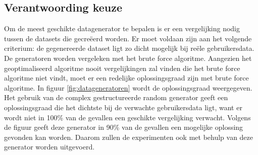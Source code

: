 \documentclass[Main.tex]{subfiles}
\begin{document}
\subsection{Verantwoording keuze}
Om de meest geschikte datagenerator te bepalen is er een vergelijking nodig tussen de datasets die gecre\"eerd worden. Er moet voldaan zijn aan het volgende criterium: de gegenereerde dataset ligt zo dicht mogelijk bij re\"ele gebruikersdata. De generatoren worden vergeleken met het brute force algoritme. Aangezien het geoptimaliseerd algoritme nooit vergelijkingen zal vinden die het brute force algoritme niet vindt, moet er een redelijke oplossingsgraad zijn met brute force algoritme. In figuur \ref{fig:datageneratoren} wordt de oplossingsgraad weergegeven. Het gebruik van de complex gestructureerde random generator geeft een oplossingsgraad die het dichtste bij de verwachte gebruikersdata ligt, want er wordt niet in 100\% van de gevallen een geschikte vergelijking verwacht. Volgens de figuur geeft deze generator in 90\% van de gevallen een mogelijke oplossing gevonden kan worden. Daarom zullen de experimenten ook met behulp van deze generator worden uitgevoerd.
\end{document}
